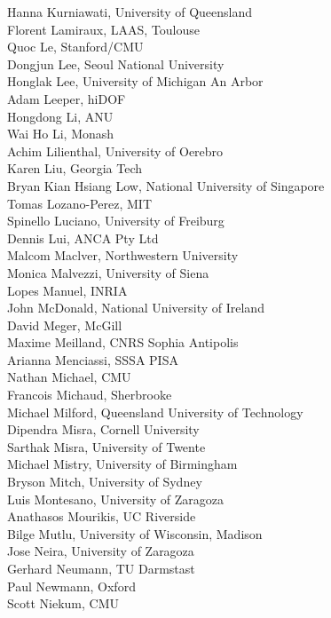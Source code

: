\begin{multicols}{3}
{Hanna Kurniawati, University of Queensland\\
Florent Lamiraux, LAAS, Toulouse\\
Quoc Le, Stanford/CMU\\
Dongjun Lee, Seoul National University\\
Honglak Lee, University of Michigan An Arbor\\
Adam Leeper, hiDOF\\
Hongdong Li, ANU\\
Wai Ho Li, Monash\\
Achim Lilienthal, University of Oerebro\\
Karen Liu, Georgia Tech\\
Bryan Kian Hsiang Low, National University of Singapore\\
Tomas Lozano-Perez, MIT\\
Spinello Luciano, University of Freiburg\\
Dennis Lui, ANCA Pty Ltd\\
Malcom Maclver, Northwestern University\\
Monica Malvezzi, University of Siena\\
Lopes Manuel, INRIA\\
John McDonald, National University of Ireland\\
David Meger, McGill\\
Maxime Meilland, CNRS Sophia Antipolis\\
Arianna Menciassi, SSSA PISA\\
Nathan Michael, CMU\\
Francois Michaud, Sherbrooke\\
Michael Milford, Queensland University of Technology\\
Dipendra Misra, Cornell University\\
Sarthak Misra, University of Twente\\
Michael Mistry, University of Birmingham\\
Bryson Mitch, University of Sydney\\
Luis Montesano, University of Zaragoza\\
Anathasos Mourikis, UC Riverside\\
Bilge Mutlu, University of Wisconsin, Madison\\
Jose Neira, University of Zaragoza\\
Gerhard Neumann, TU Darmstast\\
Paul Newmann, Oxford\\
Scott Niekum, CMU\\
}
\end{multicols}
